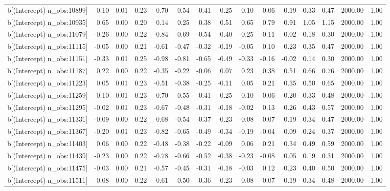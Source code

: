 \begin{table}[ht]
\begin{tabular}{rrrrrrrrrrrrrrr}
  b[(Intercept) n\_obs:10899] & -0.10 & 0.01 & 0.23 & -0.70 & -0.54 & -0.41 & -0.25 & -0.10 & 0.06 & 0.19 & 0.33 & 0.47 & 2000.00 & 1.00 \\ 
  b[(Intercept) n\_obs:10935] & 0.65 & 0.00 & 0.20 & 0.14 & 0.25 & 0.38 & 0.51 & 0.65 & 0.79 & 0.91 & 1.05 & 1.15 & 2000.00 & 1.00 \\ 
  b[(Intercept) n\_obs:11079] & -0.26 & 0.00 & 0.22 & -0.84 & -0.69 & -0.54 & -0.40 & -0.25 & -0.11 & 0.02 & 0.18 & 0.30 & 2000.00 & 1.00 \\ 
  b[(Intercept) n\_obs:11115] & -0.05 & 0.00 & 0.21 & -0.61 & -0.47 & -0.32 & -0.19 & -0.05 & 0.10 & 0.23 & 0.35 & 0.47 & 2000.00 & 1.00 \\ 
  b[(Intercept) n\_obs:11151] & -0.33 & 0.01 & 0.25 & -0.98 & -0.81 & -0.65 & -0.49 & -0.33 & -0.16 & -0.02 & 0.14 & 0.30 & 2000.00 & 1.00 \\ 
  b[(Intercept) n\_obs:11187] & 0.22 & 0.00 & 0.22 & -0.35 & -0.22 & -0.06 & 0.07 & 0.23 & 0.38 & 0.51 & 0.66 & 0.76 & 2000.00 & 1.00 \\ 
  b[(Intercept) n\_obs:11223] & 0.05 & 0.01 & 0.23 & -0.51 & -0.38 & -0.25 & -0.11 & 0.05 & 0.21 & 0.35 & 0.50 & 0.65 & 2000.00 & 1.00 \\ 
  b[(Intercept) n\_obs:11259] & -0.10 & 0.01 & 0.23 & -0.70 & -0.55 & -0.41 & -0.25 & -0.10 & 0.06 & 0.20 & 0.33 & 0.48 & 2000.00 & 1.00 \\ 
  b[(Intercept) n\_obs:11295] & -0.02 & 0.01 & 0.23 & -0.67 & -0.48 & -0.31 & -0.18 & -0.02 & 0.13 & 0.26 & 0.43 & 0.57 & 2000.00 & 1.00 \\ 
  b[(Intercept) n\_obs:11331] & -0.09 & 0.00 & 0.22 & -0.68 & -0.54 & -0.37 & -0.23 & -0.08 & 0.07 & 0.19 & 0.34 & 0.47 & 2000.00 & 1.00 \\ 
  b[(Intercept) n\_obs:11367] & -0.20 & 0.01 & 0.23 & -0.82 & -0.65 & -0.49 & -0.34 & -0.19 & -0.04 & 0.09 & 0.24 & 0.37 & 2000.00 & 1.00 \\ 
  b[(Intercept) n\_obs:11403] & 0.06 & 0.00 & 0.22 & -0.48 & -0.38 & -0.22 & -0.09 & 0.06 & 0.21 & 0.34 & 0.49 & 0.59 & 2000.00 & 1.00 \\ 
  b[(Intercept) n\_obs:11439] & -0.23 & 0.00 & 0.22 & -0.78 & -0.66 & -0.52 & -0.38 & -0.23 & -0.08 & 0.05 & 0.19 & 0.31 & 2000.00 & 1.00 \\ 
  b[(Intercept) n\_obs:11475] & -0.03 & 0.00 & 0.21 & -0.57 & -0.45 & -0.31 & -0.18 & -0.03 & 0.12 & 0.23 & 0.40 & 0.50 & 2000.00 & 1.00 \\ 
  b[(Intercept) n\_obs:11511] & -0.08 & 0.00 & 0.22 & -0.61 & -0.50 & -0.36 & -0.23 & -0.08 & 0.07 & 0.19 & 0.34 & 0.48 & 2000.00 & 1.00 \\ 

\end{tabular}
\end{table}
